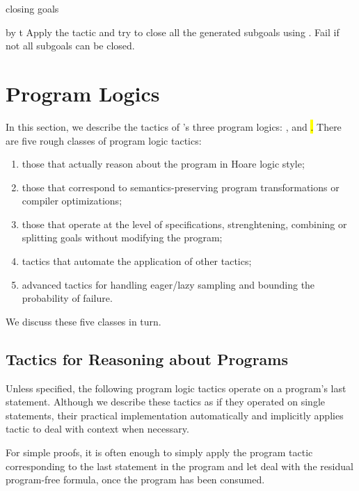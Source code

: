 \begin{tactic}[by t]{closing goals}
  \begin{tsyntax}[empty]{by t}
  Apply the tactic  and try to close all the generated subgoals using
  . Fail if not all subgoals can be closed.
  \end{tsyntax}
\end{tactic}

\section{Program Logics}
\label{ProgramLogics}

In this section, we describe the tactics of \EasyCrypt's three program
logics: \prhl, \phl and \hl.  There are five rough classes of program
logic tactics:
\begin{enumerate}
\item those that actually reason about the program in Hoare logic
  style;

\item those that correspond to semantics-preserving program
  transformations or compiler optimizations;

\item those that operate at the level of specifications,
  strenghtening, combining or splitting goals without modifying the
  program;

\item tactics that automate the application of other tactics;

\item advanced tactics for handling eager/lazy sampling and bounding
  the probability of failure.
\end{enumerate}
We discuss these five classes in turn.

\subsection{Tactics for Reasoning about Programs}
\label{ReasoningPrograms}

Unless specified, the following program logic tactics operate on a
program's last statement. Although we describe these tactics as if
they operated on single statements, their practical implementation
automatically and implicitly applies tactic  to deal with
context when necessary.

For simple proofs, it is often enough to simply apply the program
tactic corresponding to the last statement in the program and let
 deal with the residual program-free formula, once the program
has been consumed.

